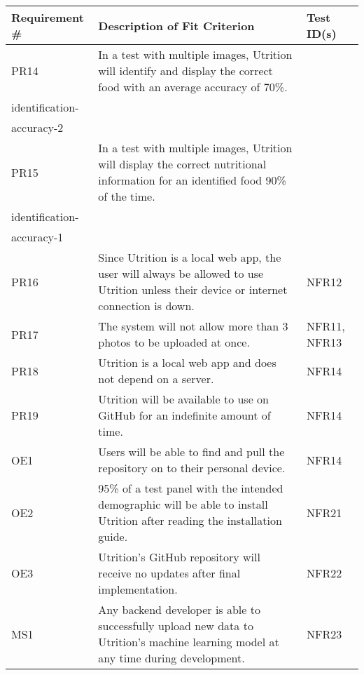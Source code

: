 \documentclass[12pt, titlepage]{article}
\begin{document}
	\begin{table}[H]
		\begin{tabularx}{\textwidth}{|l|X|l|}
			\hline
			{\bf Requirement \#} & {\bf Description of Fit Criterion} & {\bf Test ID(s)}\\
			\hline
			PR14 & In a test with multiple images, Utrition will identify and 
			display the correct food with an average accuracy of 70\%. & 
			\begin{tabular}[c]{@{}l@{}}NFR12\\ 
						identification-\\accuracy-2 \end{tabular}\\
			\hline
			PR15 & In a test with multiple images, Utrition will display the 
			correct nutritional information for an identified food 90\% of the 
			time. & \begin{tabular}[c]{@{}l@{}}NFR12\\ 
						identification-\\accuracy-1 \end{tabular}\\
			\hline
			PR16 & Since Utrition is a local web app, the user will always be allowed to use Utrition unless their device or internet connection is down. & NFR12\\
			\hline
			PR17 & The system will not allow more than 3 photos to be uploaded at once. & NFR11, NFR13\\
			\hline
			PR18 & Utrition is a local web app and does not depend on a server. & NFR14\\
			\hline
			PR19 & Utrition will be available to use on GitHub for an indefinite amount of time. & NFR14\\
			\hline
			OE1 & Users will be able to find and pull the repository on to their personal device. & NFR14\\
			\hline
			OE2 & 95\% of a test panel with the intended demographic will be able to install Utrition after reading the installation guide. & NFR21\\
			\hline
			OE3 & Utrition’s GitHub repository will receive no updates after final implementation. & NFR22\\
			\hline
			MS1 & Any backend developer is able to successfully upload new data to Utrition’s machine learning model at any time during development.  & NFR23\\
			\hline
		\end{tabularx}
	\end{table}
	
\end{document}
